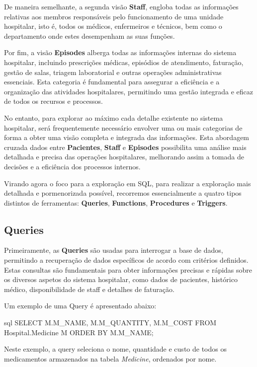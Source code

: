 De maneira semelhante, a segunda visão \textbf{Staff}, engloba todas as informações relativas aos membros responsáveis pelo funcionamento de uma unidade hospitalar, isto é, todos os médicos, enfermeiros e técnicos, bem como o departamento onde estes desempenham as suas funções.

Por fim, a visão \textbf{Episodes} alberga todas as informações internas do sistema hospitalar, incluindo prescrições médicas, episódios de atendimento, faturação, gestão de salas, triagem laboratorial e outras operações administrativas essenciais. Esta categoria é fundamental para assegurar a eficiência e a organização das atividades hospitalares, permitindo uma gestão integrada e eficaz de todos os recursos e processos.

No entanto, para explorar ao máximo cada detalhe existente no sistema hospitalar, será frequentemente necessário envolver uma ou mais categorias de forma a obter uma visão completa e integrada das informações. Esta abordagem cruzada dados entre \textbf{Pacientes}, \textbf{Staff} e \textbf{Episodes} possibilita uma análise mais detalhada e precisa das operações hospitalares, melhorando assim a tomada de decisões e a eficiência dos processos internos.

Virando agora o foco para a exploração em SQL, para realizar a exploração mais detalhada e pormenorizada possível, recorremos essencialmente a quatro tipos distintos de ferramentas: \textbf{Queries}, \textbf{Functions}, \textbf{Procedures} e \textbf{Triggers}.

\subsection{Queries}

Primeiramente, as \textbf{Queries} são usadas para interrogar a base de dados, permitindo a recuperação de dados específicos de acordo com critérios definidos. Estas consultas são fundamentais para obter informações precisas e rápidas sobre os diversos aspetos do sistema hospitalar, como dados de pacientes, histórico médico, disponibilidade de staff e detalhes de faturação.

Um exemplo de uma Query é apresentado abaixo:

\begin{myminted}{sql}
SELECT M.M_NAME, M.M_QUANTITY, M.M_COST
FROM Hospital.Medicine M
ORDER BY M.M_NAME;
\end{myminted}

Neste exemplo, a query seleciona o nome, quantidade e custo de todos os medicamentos armazenados na tabela \textit{Medicine}, ordenados por nome.

